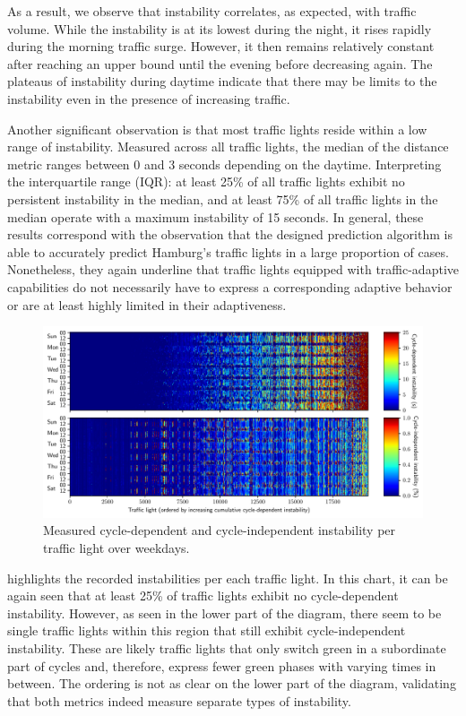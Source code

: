As a result, we observe that instability correlates, as expected, with traffic volume. While the instability is at its lowest during the night, it rises rapidly during the morning traffic surge. However, it then remains relatively constant after reaching an upper bound until the evening before decreasing again. The plateaus of instability during daytime indicate that there may be limits to the instability even in the presence of increasing traffic. 

Another significant observation is that most traffic lights reside within a low range of instability. Measured across all traffic lights, the median of the distance metric ranges between 0 and 3 seconds depending on the daytime. Interpreting the interquartile range (IQR): at least 25\% of all traffic lights exhibit no persistent instability in the median, and at least 75\% of all traffic lights in the median operate with a maximum instability of 15 seconds. In general, these results correspond with the observation that the designed prediction algorithm is able to accurately predict Hamburg's traffic lights in a large proportion of cases. Nonetheless, they again underline that traffic lights equipped with traffic-adaptive capabilities do not necessarily have to express a corresponding adaptive behavior or are at least highly limited in their adaptiveness.

\begin{figure}[ht]
    \centering
    \includegraphics[width=\linewidth]{images/predictability-week-heatmap-per-thing.pdf}
    \caption{Measured cycle-dependent and cycle-independent instability per traffic light over weekdays.}\label{fig:adaptiveness-weekdays-comparison}
\end{figure}

 highlights the recorded instabilities per each traffic light. In this chart, it can be again seen that at least 25\% of traffic lights exhibit no cycle-dependent instability. However, as seen in the lower part of the diagram, there seem to be single traffic lights within this region that still exhibit cycle-independent instability. These are likely traffic lights that only switch green in a subordinate part of cycles and, therefore, express fewer green phases with varying times in between. The ordering is not as clear on the lower part of the diagram, validating that both metrics indeed measure separate types of instability.

